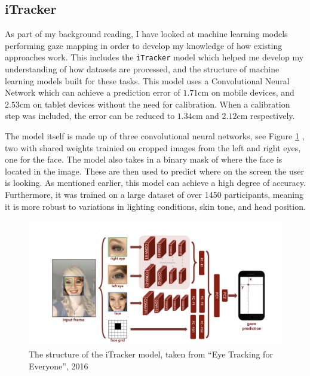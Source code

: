 \documentclass[twocolumn]{report}
\begin{document}
\subsection{iTracker}\label{sec:itracker}

As part of my background reading, I have looked at machine learning models performing gaze mapping in order to develop my knowledge of how existing approaches work. This includes the \verb|iTracker| model \cite{krafka2016eye} which helped me develop my understanding of how datasets are processed, and the structure of machine learning models built for these tasks. This model uses a Convolutional Neural Network which can achieve a prediction error of $1.71\text{cm}$ on mobile devices, and $2.53\text{cm}$ on tablet devices without the need for calibration. When a calibration step was included, the error can be reduced to $1.34\text{cm}$ and $2.12\text{cm}$ respectively. 

The model itself is made up of three convolutional neural networks, see Figure \ref{fig:itracker-model} , two with shared weights trainied on cropped images from the left and right eyes, one for the face. The model also takes in a binary mask of where the face is located in the image. These are then used to predict where on the screen the user is looking. As mentioned earlier, this model can achieve a high degree of accuracy. Furthermore, it was trained on a large dataset of over 1450 participants, meaning it is more robust to variations in lighting conditions, skin tone, and head position. 

\begin{figure}[h]
    \begin{center}
        \includegraphics[scale=0.3]{../assets/iTracker-network.png}
    \end{center}
    \caption{The structure of the iTracker model, taken from ``Eye Tracking for Everyone'', 2016 \cite{krafka2016eye}}
    \label{fig:itracker-model}
\end{figure}
\end{document}

